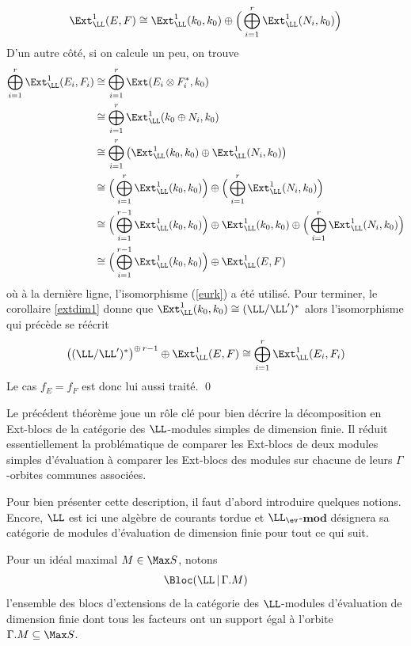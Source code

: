\begin{Thm}
\begin{pre}
\begin{equation} \label{eurk}
\Ext_\LL^1(E,F) \cong \Ext_\LL^1(k_0,k_0) \oplus \Big(\bigoplus_{i=1}^r \Ext_\LL^1(N_i,k_0)\Big)
\end{equation}
D'un autre côté, si on calcule un peu, on trouve
\begin{align*}
\bigoplus_{i=1}^r \Ext_\LL^1(E_i,F_i) &\cong \bigoplus_{i=1}^r \Ext(E_i \otimes F_i^*,k_0)\\
&\cong \bigoplus_{i=1}^r \Ext_\LL^1(k_0 \oplus N_i,k_0)\\
&\cong \bigoplus_{i=1}^r \big(\Ext_\LL^1(k_0,k_0) \oplus \Ext_\LL^1(N_i,k_0)\big)\\
&\cong \Big(\bigoplus_{i=1}^r \Ext_\LL^1(k_0,k_0)\Big) \oplus \Big(\bigoplus_{i=1}^r \Ext_\LL^1(N_i,k_0)\Big)\\
&\cong \Big(\bigoplus_{i=1}^{r-1} \Ext_\LL^1(k_0,k_0)\Big) \oplus \Ext_\LL^1(k_0,k_0) \oplus \Big(\bigoplus_{i=1}^r \Ext_\LL^1(N_i,k_0)\Big)\\
&\cong \Big(\bigoplus_{i=1}^{r-1} \Ext_\LL^1(k_0,k_0)\Big) \oplus \Ext_\LL^1(E,F)
\end{align*}
où à la dernière ligne, l'isomorphisme (\ref{eurk}) a été utilisé. Pour terminer, le corollaire \ref{extdim1} donne que $\Ext_\LL^1(k_0,k_0) \cong (\LL / \LL')^*$ alors l'isomorphisme qui précède se réécrit
$$ \big((\LL / \LL')^*\big)^{\oplus\,r-1} \oplus \Ext_\LL^1(E,F) \cong \bigoplus_{i=1}^r \Ext_\LL^1(E_i,F_i) $$
Le cas $f_E = f_F$ est donc lui aussi traité. \qed
\end{pre}
\end{Thm}

Le précédent théorème joue un rôle clé pour bien décrire la décomposition en Ext-blocs de la catégorie des $\LL$-modules simples de dimension finie. Il réduit essentiellement la problématique de comparer les Ext-blocs de deux modules simples d'évaluation à comparer les Ext-blocs des modules sur chacune de leurs $\Gamma$-orbites communes associées.

Pour bien présenter cette description, il faut d'abord introduire quelques notions. Encore, $\LL$ est ici une algèbre de courants tordue et $\LL_{\ev}$-$\mathbf{mod}$ désignera sa catégorie de modules d'évaluation de dimension finie pour tout ce qui suit.

\begin{Def} Pour un idéal maximal $M \in \Max S$, notons 
$$ \Bloc(\LL \, | \, \Gamma.M) $$ 
l'ensemble des blocs d'extensions de la catégorie des $\LL$-modules d'évaluation de dimension finie dont tous les facteurs ont un support égal à l'orbite $\Gamma.M \subseteq \Max S$.
\end{Def}

